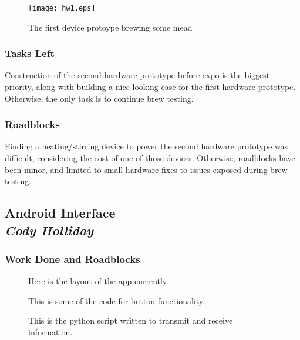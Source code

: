\documentclass[draftclsnofoot,onecolumn,letterpaper,10pt]{IEEEtran}
\begin{document}
\begin{figure}
\label{fig:hw1}
\caption{The first device protoype brewing some mead}
\texttt{[image: hw1.eps]}
\end{figure}

\subsubsection{Tasks Left}
Construction of the second hardware prototype before expo is the biggest priority, along
with building a nice looking case for the first hardware prototype.
Otherwise, the only task is to continue brew testing.

\subsubsection{Roadblocks}
Finding a heating/stirring device to power the second hardware prototype was difficult, considering
the cost of one of those devices.
Otherwise, roadblocks have been minor, and limited to small hardware fixes to issues exposed during
brew testing.

\subsection{Android Interface\\{\em\textbf{Cody Holliday}}}


\subsubsection{Work Done and Roadblocks}

\newpage
\vfill

\begin{figure}
\label{fig:layout}
\caption{Here is the layout of the app currently.}
\end{figure}


\begin{figure}
\label{fig:code}
\caption{This is some of the code for button functionality.}
\end{figure}


\begin{figure}
\label{fig:python}
\caption{This is the python script written to transmit and receive information.}
\end{figure}
\end{document}
